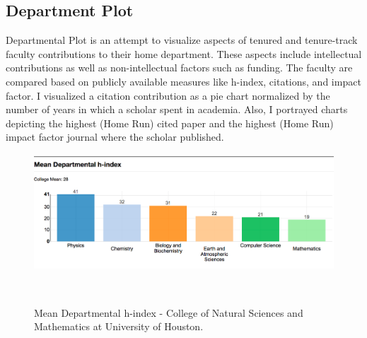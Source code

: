 
\subsection{Department Plot}

Departmental Plot is an attempt to visualize aspects of tenured and tenure-track faculty contributions to their home department. These aspects include intellectual contributions as well as non-intellectual factors such as funding. The faculty are compared based on publicly available measures like h-index, citations, and impact factor. I visualized a citation contribution as a pie chart normalized by the number of years in which a scholar spent in academia. Also, I portrayed charts depicting the highest (Home Run) cited paper and the highest (Home Run) impact factor journal where the scholar published.


\begin{figure}
  \centering
  \includegraphics[width=1\textwidth]{figures/Coll-h-HD}
  \caption{Mean Departmental h-index
 - College of Natural Sciences and Mathematics at University of Houston.}~\label{fig:DP-College1}
\end{figure}

